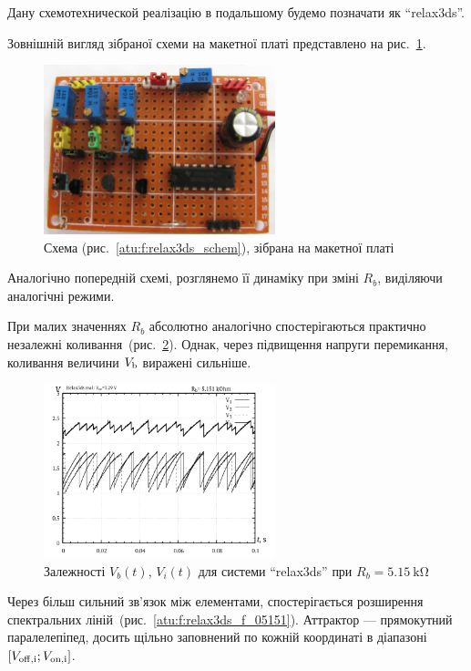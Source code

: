 Дану схемотехнической реалізацію в подальшому будемо позначати як ``relax3ds''.

Зовнішній вигляд зібраної схеми на макетної платі
представлено на рис.~\ref{atu:f:relax3ds_board}.

\begin{figure}[htb!]
  \centerline{\includegraphics[width=0.6\textwidth]{p/relax3ds_board.jpg} }
\caption{Схема (рис.~\ref{atu:f:relax3ds_schem}), зібрана на макетної платі}
\label{atu:f:relax3ds_board}
\end{figure}

Аналогічно попередній схемі, розглянемо її динаміку при зміні
$ R_b $, виділяючи аналогічні режими.

При малих значеннях
$ R_b $ абсолютно аналогічно спостерігаються практично незалежні
коливання~(рис.~\ref{atu:f:relax3ds_t_05151}). Однак, через підвищення напруги
перемикання, коливання величини
$ V _\mathrm{b} $ виражені сильніше.

\begin{figure}[htb!]
  \centerline{\includegraphics[width=0.6\textwidth]{p/relax3ds_t_005151.png} }
\caption{Залежності $ V_b (t) $, $ V_i (t) $ для системи ``relax3ds'' при $ R_b = \SI{5.15}{\kilo \ohm} $}
  \label{atu:f:relax3ds_t_05151}
\end{figure}


Через більш сильний зв'язок між елементами, спостерігається
розширення спектральних ліній~(рис.~\ref{atu:f:relax3ds_f_05151}). Аттрактор
--- прямокутний паралелепіпед, досить щільно заповнений по кожній
координаті в діапазоні
$ [V _\mathrm{off, i}; V _\mathrm{on, i}] $.


